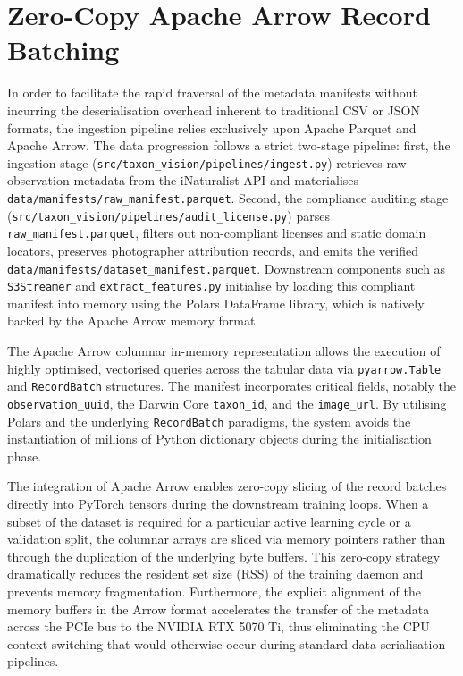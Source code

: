 \section{Zero-Copy Apache Arrow Record Batching}
\label{sec:arrow_record_batching}

In order to facilitate the rapid traversal of the metadata manifests without incurring the deserialisation overhead inherent to traditional CSV or JSON formats, the ingestion pipeline relies exclusively upon Apache Parquet and Apache Arrow. The data progression follows a strict two-stage pipeline: first, the ingestion stage (\texttt{src/taxon\_vision/pipelines/ingest.py}) retrieves raw observation metadata from the iNaturalist API and materialises \texttt{data/manifests/raw\_manifest.parquet}. Second, the compliance auditing stage (\texttt{src/taxon\_vision/pipelines/audit\_license.py}) parses \texttt{raw\_manifest.parquet}, filters out non-compliant licenses and static domain locators, preserves photographer attribution records, and emits the verified \texttt{data/manifests/dataset\_manifest.parquet}. Downstream components such as \texttt{S3Streamer} and \texttt{extract\_features.py} initialise by loading this compliant manifest into memory using the Polars DataFrame library, which is natively backed by the Apache Arrow memory format.

The Apache Arrow columnar in-memory representation allows the execution of highly optimised, vectorised queries across the tabular data via \texttt{pyarrow.Table} and \texttt{RecordBatch} structures. The manifest incorporates critical fields, notably the \texttt{observation\_uuid}, the Darwin Core \texttt{taxon\_id}, and the \texttt{image\_url}. By utilising Polars and the underlying \texttt{RecordBatch} paradigms, the system avoids the instantiation of millions of Python dictionary objects during the initialisation phase.

The integration of Apache Arrow enables zero-copy slicing of the record batches directly into PyTorch tensors during the downstream training loops. When a subset of the dataset is required for a particular active learning cycle or a validation split, the columnar arrays are sliced via memory pointers rather than through the duplication of the underlying byte buffers. This zero-copy strategy dramatically reduces the resident set size (RSS) of the training daemon and prevents memory fragmentation. Furthermore, the explicit alignment of the memory buffers in the Arrow format accelerates the transfer of the metadata across the PCIe bus to the NVIDIA RTX 5070 Ti, thus eliminating the CPU context switching that would otherwise occur during standard data serialisation pipelines.

